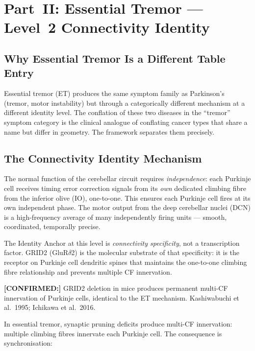 \documentclass[12pt,a4paper]{article}
\newcommand{\confirmed}[1]{\noindent\colorbox{green!10}{\parbox{\dimexpr\linewidth-2\fboxsep}{%
  \textbf{[CONFIRMED:]} #1}}\vspace{0.4em}}
\begin{document}
\section{Part~II: Essential Tremor --- Level~2 Connectivity Identity}

\subsection{Why Essential Tremor Is a Different Table Entry}

Essential tremor (ET) produces the same symptom family as Parkinson's
(tremor, motor instability) but through a categorically different mechanism
at a different identity level. The conflation of these two diseases in the
``tremor'' symptom category is the clinical analogue of conflating cancer
types that share a name but differ in geometry. The framework separates them
precisely.

\subsection{The Connectivity Identity Mechanism}

The normal function of the cerebellar circuit requires \textit{independence}:
each Purkinje cell receives timing error correction signals from its
\textit{own} dedicated climbing fibre from the inferior olive (IO), one-to-one.
This ensures each Purkinje cell fires at its own independent phase. The motor
output from the deep cerebellar nuclei (DCN) is a high-frequency average of
many independently firing units --- smooth, coordinated, temporally precise.

The Identity Anchor at this level is \textit{connectivity specificity}, not a
transcription factor. GRID2 (GluR$\delta$2) is the molecular substrate of
that specificity: it is the receptor on Purkinje cell dendritic spines that
maintains the one-to-one climbing fibre relationship and prevents multiple CF
innervation.

\confirmed{GRID2 deletion in mice produces permanent multi-CF innervation of
Purkinje cells, identical to the ET mechanism. Kashiwabuchi et al.\ 1995;
Ichikawa et al.\ 2016.}

In essential tremor, synaptic pruning deficits produce multi-CF innervation:
multiple climbing fibres innervate each Purkinje cell. The consequence is
synchronisation:
\end{document}
